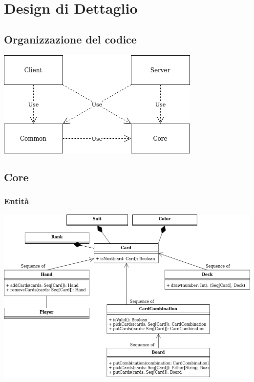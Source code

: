\documentclass{article}
\begin{document}
    \newpage


    \section{Design di Dettaglio}\label{sec:design-di-dettaglio}

    \subsection{Organizzazione del codice}
    \begin{center}
        \includegraphics[scale=0.5]{moduli.png}
    \end{center}

    \subsection{Core}

    \subsubsection{Entità}
    \begin{center}
        \includegraphics[scale=0.5]{classi-Page-1.png}
    \end{center}
\end{document}
